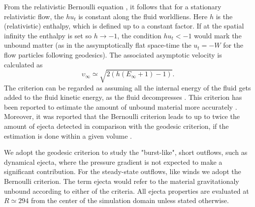 From the relativistic Bernoulli equation \citep{Rezzolla:2013}, it follows
that for a stationary relativistic flow, the $hu_t$ is constant along the 
fluid worldliens. Here $h$ is the (relativistic) enthalpy, which is
defined up to a constant factor. 
%
If at the spatial infinity the enthalpy is set so $h\rightarrow-1$, 
the condition $hu_t < -1$ would mark the unbound matter 
(as in the assymptotically flat space-time the 
$u_t = -W$ for the flow particles following geodesics).
%
The associated asymptotic velocity is calculated as 
%
\begin{equation}
\upsilon_{\infty} \simeq \sqrt{2 (h (E_{\infty}+1)-1)}. 
\end{equation}
%
The criterion can be regarded as assuming all the internal energy of the fluid 
gets added to the fluid kinetic energy, as the fluid decompresses .
%
%
This criterion has been reported to estimate the amount of unbound material more accurately
\citep{Foucart:2015gaa}. 
Moreover, it was reported that the Bernoulli criterion leads to up to twice 
the amount of ejecta detected in comparison with the geodesic criterion, 
if the estimation is done within a given volume \citep{Kastaun:2014fna}.



We adopt the geodesic criterion to study the "burst-like", short outflows,
such as dynamical ejecta, where the pressure gradient is not expected to make a significant contribution.
For the steady-state outflows, like \pmerg{} winds we adopt the Bernoulli criterion.
%
The term ejecta would refer to the material gravitationaly 
unbound according to either of the criteria.
%
All ejecta properties are evaluated at $R \simeq 294$ from the center of the 
simulation domain unless stated otherwise. 







